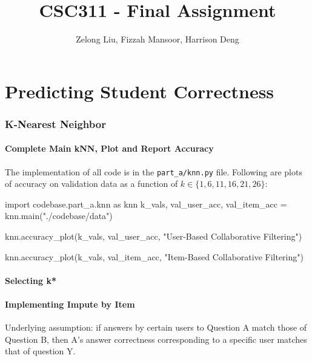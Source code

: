 \documentclass{article}
\title{CSC311 - Final Assignment}
\author{Zelong Liu, Fizzah Mansoor, Harrison Deng}
\begin{document}
    \maketitle

    \pagebreak

    \tableofcontents

    \pagebreak
    
    \part{Predicting Student Correctness}
    
    \section{K-Nearest Neighbor}
    \subsection{Complete Main kNN, Plot and Report Accuracy}
    The implementation of all code is in the \verb|part_a/knn.py| file. Following are plots of accuracy on validation data as a function of $k \in \{1,6,11,16,21,26\}$:

    \begin{pylabblock}[KNN]
        import codebase.part_a.knn as knn
        k_vals, val_user_acc, val_item_acc = knn.main("./codebase/data")
    \end{pylabblock}

    \begin{pylabblock}[KNN]
        knn.accuracy_plot(k_vals, val_user_acc, "User-Based Collaborative Filtering")
    \end{pylabblock}

    \begin{pylabblock}[KNN]
        knn.accuracy_plot(k_vals, val_item_acc, "Item-Based Collaborative Filtering")
    \end{pylabblock}

    


    \subsection{Selecting k*}
    
    \subsection{Implementing Impute by Item}
    Underlying assumption: if answers by certain users to Question A match those of Question B, then A’s answer correctness corresponding to a specific user matches that of question Y. 
\end{document}
